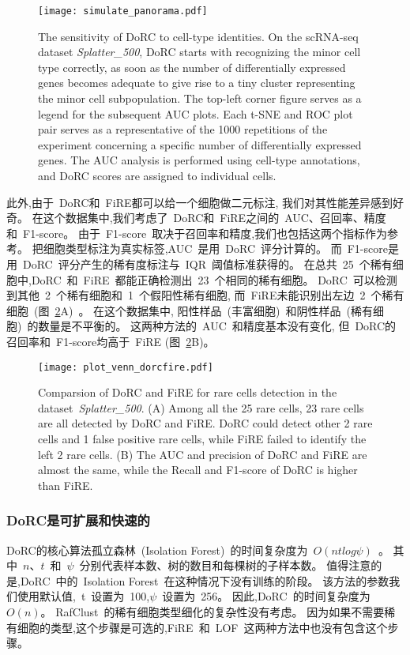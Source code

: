 \begin{figure}[!htbp]
    \centering
    \texttt{[image: simulate\_panorama.pdf]}
    \caption{The sensitivity of DoRC to cell-type identities. 
    On the scRNA-seq dataset \textit{Splatter\_500}, 
    DoRC starts with recognizing the minor cell type correctly, 
    as soon as the number of differentially expressed genes becomes adequate to give rise to a tiny cluster representing the minor cell
    subpopulation. 
    The top-left corner figure serves as a legend for the subsequent AUC plots. 
    Each t-SNE and ROC plot pair serves as a representative of the 1000 repetitions of the experiment concerning a
    specific number of differentially expressed genes. 
    The AUC analysis is performed using cell-type annotations, 
    and DoRC scores are assigned to individual cells.}
    \label{fig:simulate:roc}
\end{figure}

此外,由于~DoRC和~FiRE都可以给一个细胞做二元标注,
我们对其性能差异感到好奇。
在这个数据集中,我们考虑了~DoRC和~FiRE之间的~AUC、召回率、精度和~F1-score。
由于~F1-score~取决于召回率和精度,我们也包括这两个指标作为参考。
把细胞类型标注为真实标签,AUC~是用~DoRC~评分计算的。
而~F1-score是用~DoRC~评分产生的稀有度标注与~IQR~阈值标准获得的。
在总共~25~个稀有细胞中,DoRC~和~FiRE~都能正确检测出~23~个相同的稀有细胞。
DoRC~可以检测到其他~2~个稀有细胞和~1~个假阳性稀有细胞,
而~FiRE未能识别出左边~2~个稀有细胞~(图~\ref{fig:simulate:venn_auc_f1}A)~。
在这个数据集中, 阳性样品~(丰富细胞)~和阴性样品~(稀有细胞)~的数量是不平衡的。
这两种方法的~AUC~和精度基本没有变化,
但~DoRC的召回率和~F1-score均高于~FiRE (图~\ref{fig:simulate:venn_auc_f1}B)。
\begin{figure}[!htbp]
    \centering
    \texttt{[image: plot\_venn\_dorcfire.pdf]}
    \caption{Comparsion of DoRC and FiRE for rare cells detection in the dataset~\textit{Splatter\_500}.
    (A) Among all the 25 rare cells,  23 rare cells are all detected by DoRC and FiRE. 
    DoRC could detect other 2 rare cells and 1 false positive rare cells, 
    while FiRE failed to identify the left 2 rare cells.
    (B) The AUC and precision of DoRC and FiRE are almost the same, while the Recall and  F1-score of DoRC is higher than FiRE.}
    \label{fig:simulate:venn_auc_f1}
\end{figure}

\subsubsection{DoRC是可扩展和快速的}
\label{subsec:scalable} 
DoRC的核心算法孤立森林~(Isolation Forest)~的时间复杂度为~$O(ntlog\psi)$~\cite{liu2008isolation}。
其中~$n$、$t$~和~$\psi$~分别代表样本数、树的数目和每棵树的子样本数。
值得注意的是,DoRC~中的~Isolation Forest~在这种情况下没有训练的阶段。
该方法的参数我们使用默认值,~t~设置为~100,$\psi$~设置为~256。
因此,DoRC~的时间复杂度为~$O(n)$。
RafClust~的稀有细胞类型细化的复杂性没有考虑。
因为如果不需要稀有细胞的类型,这个步骤是可选的,FiRE~和~LOF~这两种方法中也没有包含这个步骤。

